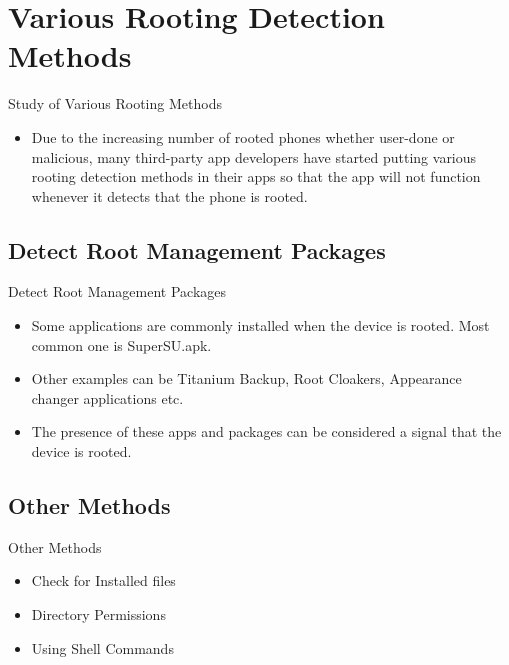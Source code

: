 \documentclass{beamer}
\begin{document}
\section{Various Rooting Detection Methods}
\begin{frame}{Study of Various Rooting Methods}
    \begin{itemize}
        \item Due to the increasing number of rooted phones whether user-done or malicious, many third-party app developers have started putting various rooting detection methods in their apps so that the app will not function whenever it detects that the phone is rooted.
    \end{itemize}
\end{frame}

\subsection{Detect Root Management Packages}
\begin{frame}{Detect Root Management Packages}
    \begin{itemize}
        \item Some applications are commonly installed when the device is rooted. Most common one is SuperSU.apk.
        \item Other examples can be Titanium Backup, Root Cloakers, Appearance changer applications etc.
        \item The presence of these apps and packages can be considered a signal that the device is rooted.
    \end{itemize}
\end{frame}

\subsection{Other Methods}
\begin{frame}{Other Methods}
    \begin{itemize}
        \item Check for Installed files
        \item Directory Permissions
        \item Using Shell Commands
    \end{itemize}
\end{frame}
\end{document}
